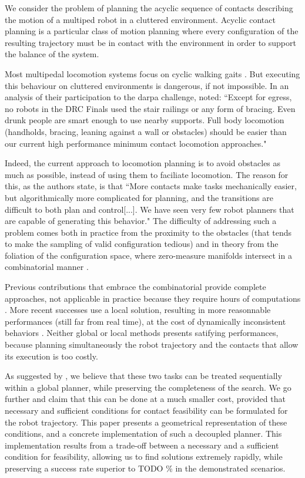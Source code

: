 We consider the problem of planning the acyclic sequence of contacts describing the motion of a multiped robot in a cluttered environment. Acyclic contact planning is a particular class of motion planning where every configuration of the resulting trajectory must be in contact with the environment in order to support the balance of the system.

Most multipedal locomotion systems focus on cyclic walking gaits \citep{Kajita03a}. But executing
this behaviour on cluttered environments is dangerous, if not impossible.
In an analysis of their participation to the darpa challenge, \citeauthor{atkensondarpa}
noted: ``Except for egress, no robots in the DRC Finals used
the  stair  railings  or  any  form  of  bracing.   Even  drunk  people  are  smart  enough  to  use  nearby  supports.
Full body locomotion (handholds,  bracing,  leaning against a wall or obstacles) should be easier than our
current high performance minimum contact locomotion approaches."

Indeed, the current approach to locomotion planning is to avoid obstacles as much as possible, instead of using them
to faciliate locomotion. The reason for this, as the authors state, is that ``More contacts make tasks
mechanically easier, but algorithmically more complicated for planning, and the transitions are difficult to
both plan and control[...].  We have seen very few robot planners that are  capable of  generating this  behavior."
The difficulty of addressing such a problem comes both in practice from the proximity to the obstacles (that tends to make the sampling of valid configuration tedious) and in theory from the foliation of the configuration space, where zero-measure manifolds intersect in a combinatorial manner \citep{simeon-manipulation-04}.

Previous contributions that embrace the combinatorial provide complete approaches, not applicable in practice because they require hours of computations \citep{conf/iser/BretlRLKA04}.
More recent successes use a local solution, resulting in more reasonnable performances (still far from real time), at the cost of dynamically inconsistent behaviors \citep{Mordatch:2012:DCB:2185520.2185539}.
Neither global or local methods presents satifying performances, because planning simultaneously the robot trajectory and the contacts that allow
its execution is too costly. 

As suggested by \citeauthor{Bouyarmane2009}, we believe that these two tasks can be treated sequentially within a global planner, while preserving the completeness of the search.
We go further and claim that this can be done at a much smaller cost, provided that necessary and sufficient conditions for contact feasibility can be formulated for the robot trajectory.
This paper presents a geometrical representation of these conditions, and a concrete implementation of such a decoupled planner.
This implementation results from a trade-off between a necessary and a sufficient condition for feasibility, allowing us to find solutions extremely rapidly,
while preserving a success rate superior to TODO \% in the demonstrated scenarios.

